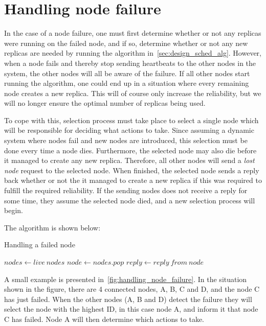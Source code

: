 \documentclass{cslthse-msc}
\begin{document}
\section{Handling node failure} \label{sec:design_handling_failure}
In the case of a node failure, one must first determine whether or not any replicas were running on the failed node, and if so, determine whether or not any new replicas are needed by running the algorithm in~\cref{sec:design_sched_alg}. However, when a node fails and thereby stop sending heartbeats to the other nodes in the system, the other nodes will all be aware of the failure. If all other nodes start running the algorithm, one could end up in a situation where every remaining node creates a new replica. This will of course only increase the reliability, but we will no longer ensure the optimal number of replicas being used. 

To cope with this, selection process must take place to select a single node which will be responsible for deciding what actions to take. Since assuming a dynamic system where nodes fail and new nodes are introduced, this selection must be done every time a node dies. Furthermore, the selected node may also die before it managed to create any new replica. Therefore, all other nodes will send a \emph{lost node} request to the selected node. When finished, the selected node sends a reply back whether or not the it managed to create a new replica if this was required to fulfill the required reliability. If the sending nodes does not receive a reply for some time, they assume the selected node died, and a new selection process will begin.

The algorithm is shown below: %

\begin{algorithm}\label{alg:node_failure}
	\caption{Handling a failed node}
	\begin{algorithmic}[1]
	\State $nodes\gets live\ nodes$
	\Do
		\State $node\gets nodes.pop$
		\State
		\State $reply\gets reply\ from\ node$
	\end{algorithmic}
\end{algorithm}

A small example is presented in~\cref{fig:handling_node_failure}. In the situation shown in the figure, there are 4 connected nodes, A, B, C and D, and the node C has just failed. When the other nodes (A, B and D) detect the failure they will select the node with the highest ID, in this case node A, and inform it that node C has failed. Node A will then determine which actions to take.
\end{document}
